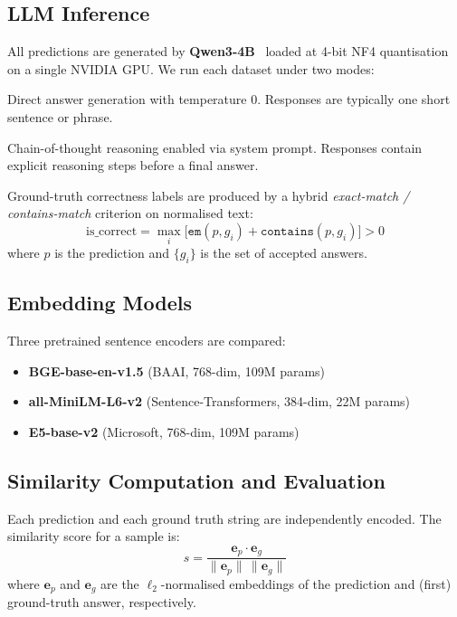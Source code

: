\documentclass[11pt,a4paper]{article}
\begin{document}
\subsection{LLM Inference}

All predictions are generated by \textbf{Qwen3-4B}~\citep{qwen3} loaded at 4-bit
NF4 quantisation on a single NVIDIA GPU.
We run each dataset under two modes:

\begin{description}[nosep]
  \item[\texttt{no\_thinking}] Direct answer generation with temperature 0.
        Responses are typically one short sentence or phrase.
  \item[\texttt{thinking}] Chain-of-thought reasoning enabled via system prompt.
        Responses contain explicit reasoning steps before a final answer.
\end{description}

Ground-truth correctness labels are produced by a hybrid
\emph{exact-match / contains-match} criterion on normalised text:
\begin{equation}
  \text{is\_correct} = \max_i \bigl[\texttt{em}(p, g_i) + \texttt{contains}(p, g_i)\bigr] > 0
\end{equation}
where $p$ is the prediction and $\{g_i\}$ is the set of accepted answers.

\subsection{Embedding Models}

Three pretrained sentence encoders are compared:
\begin{itemize}[nosep]
  \item \textbf{BGE-base-en-v1.5} (BAAI, 768-dim, 109M params)
  \item \textbf{all-MiniLM-L6-v2} (Sentence-Transformers, 384-dim, 22M params)
  \item \textbf{E5-base-v2} (Microsoft, 768-dim, 109M params)
\end{itemize}

\subsection{Similarity Computation and Evaluation}

Each prediction and each ground truth string are independently encoded.
The similarity score for a sample is:
\begin{equation}
  s = \frac{\mathbf{e}_p \cdot \mathbf{e}_g}{\|\mathbf{e}_p\|\,\|\mathbf{e}_g\|}
\end{equation}
where $\mathbf{e}_p$ and $\mathbf{e}_g$ are the $\ell_2$-normalised embeddings of
the prediction and (first) ground-truth answer, respectively.
\end{document}
